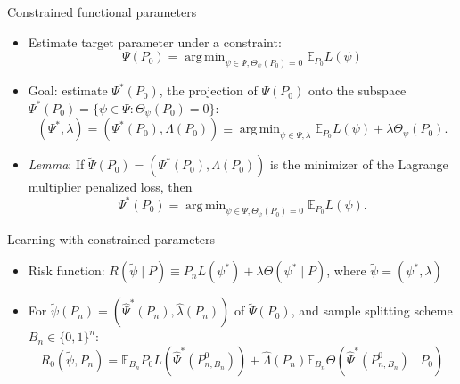 \documentclass[12pt,t,handout]{beamer}
\newcommand{\E}{\mathbb{E}}
\DeclareMathOperator*{\argmin}{arg\,min}
\begin{document}

\begin{frame}[c]{Constrained functional parameters}

\begin{center}
\begin{itemize}
  \itemsep12pt
  \item Estimate target parameter under a constraint:
    $$\Psi(P_0) = \argmin_{\psi \in \Psi, \Theta_{\psi}(P_0) = 0}
      \E_{P_0}L(\psi)$$
  \item Goal: estimate $\Psi^*(P_0)$, the projection of $\Psi(P_0)$ onto the
    subspace $\Psi^*(P_0) = \{\psi \in \Psi: \Theta_{\psi}(P_0) = 0\}$:
    $$(\Psi^*, \lambda) = (\Psi^*(P_0), \Lambda(P_0)) \equiv \argmin_{\psi \in
      \Psi, \lambda} \E_{P_0}L(\psi) + \lambda \Theta_{\psi}(P_0).$$
  \item \textit{Lemma}: If $\widetilde{\Psi}(P_0) = (\Psi^*(P_0), \Lambda(P_0))$
    is the minimizer of the Lagrange multiplier penalized loss, then
    $$\Psi^*(P_0) = \argmin_{\psi \in \Psi, \Theta_{\psi}(P_0) = 0}
      \E_{P_0}L(\psi).$$
\end{itemize}
\end{center}

\note{
}

\end{frame}


\begin{frame}[c]{Learning with constrained parameters}

\begin{center}
\begin{itemize}
  \itemsep14pt
  \item Risk function: $R(\widetilde{\psi} \mid P) \equiv P_nL(\psi^*) +
    \lambda \Theta(\psi^* \mid P)$, where $\widetilde{\psi} = (\psi^*,
    \lambda)$
  \item For $\widetilde{\psi}(P_n) = (\hat{\Psi}^*(P_n), \hat{\lambda}(P_n))$ of
    $\widetilde{\Psi}(P_0)$, and sample splitting scheme $B_n \in \{0, 1\}^n$:
    $$R_0(\widetilde{\psi}, P_n) = \E_{B_n} P_0L(\hat{\Psi}^*(P_{n, B_n}^0)) +
      \hat{\Lambda}(P_n) \E_{B_n} \Theta(\hat{\Psi}^*(P_{n, B_n}^0) \mid P_0)$$
\end{itemize}
\end{center}


\end{frame}
\end{document}
